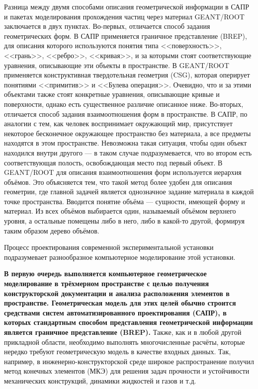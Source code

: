 Разница между двумя способами описания геометрической информации в САПР и пакетах моделирования прохождения частиц через материал GEANT/ROOT заключается в двух пунктах. Во-первых, отличается способ задания геометрических форм. В САПР применяется граничное представление (BREP), для описания которого используются понятия типа <<поверхность>>, <<грань>>, <<ребро>>, <<кривая>>, и за которыми стоят соответствующие уравнения, описывающие эти объекты в пространстве. В GEANT/ROOT применяется конструктивная твердотельная геометрия (CSG), которая оперирует понятиями <<примитив>> и <<Булева операция>>. Очевидно, что и за этими объектами также стоят конкретные уравнения, описывающие кривые и поверхности, однако есть существенное различие описанное ниже. Во-вторых, отличается способ задания взаимоотношения форм в пространстве. В САПР, по аналогии с тем, как человек воспринимает окружающий мир, присутствует некоторое бесконечное окружающее пространство без материала, а все предметы находятся в этом пространстве. Невозможна такая ситуация, чтобы один объект находился внутри другого --- в таком случае подразумевается, что во втором есть соответствующая полость, освобождающая место под первый объект.
В GEANT/ROOT для описания взаимоотношения форм используется иерархия объёмов. Это объясняется тем, что такой метод более удобен для описания геометрии, где главной задачей является однозначное задание материала в каждой точке пространства. Вводится понятие объёма --- сущности, имеющей форму и материал. Из всех объёмов выбирается один, называемый объёмом верхнего уровня, а остальные помещены либо в него, либо в какой-то другой, формируя таким образом дерево объёмов.

Процесс проектирования современной экспериментальной установки подразумевает разнообразное компьютерное моделирование этой установки.

\textbf{В первую очередь выполняется компьютерное геометрическое моделирование в трёхмерном пространстве с целью получения конструкторской документации и анализа расположения элементов в пространстве. Геометрическая модель для этих целей обычно строится средствами систем автоматизированного проектирования (САПР), в которых стандартным способом представления геометрической информации является граничное представление (BREP).}
Также, как и в любой другой прикладной области, необходимо выполнять многочисленные расчёты, которые нередко требуют геометрическую модель в качестве входных данных.
Так, например, в инженерно-конструкторской среде широкое распространение получил метод конечных элементов (МКЭ) для решения задач прочности и устойчивости механических конструкций, динамики жидкостей и газов и т.д.

